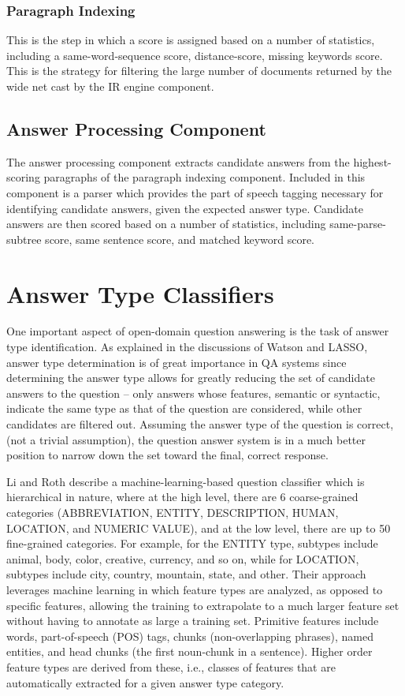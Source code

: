 \subsubsection{Paragraph Indexing}

This is the step in which a score is assigned based on a number of statistics, including a same-word-sequence score, distance-score, missing keywords score.  This is the strategy for filtering the large number of documents returned by the wide net cast by the IR engine component.

\subsection{Answer Processing Component}

The answer processing component extracts candidate answers from the highest-scoring paragraphs of the paragraph indexing component.  Included in this component is a parser which provides the part of speech tagging necessary for identifying candidate answers, given the expected answer type.  Candidate answers are then scored based on a number of statistics, including same-parse-subtree score, same sentence score, and matched keyword score.


\section{Answer Type Classifiers}

One important aspect of open-domain question answering is the task of answer type identification.  As explained in the discussions of Watson and LASSO, answer type determination is of great importance in QA systems since determining the answer type allows for greatly reducing the set of candidate answers to the question – only answers whose features, semantic or syntactic, indicate the same type as that of the question are considered, while other candidates are filtered out.  Assuming the answer type of the question is correct, (not a trivial assumption), the question answer system is in a much better position to narrow down the set toward the final, correct response.

Li and Roth \cite{li2002learning} describe a machine-learning-based question classifier which is hierarchical in nature, where at the high level, there are 6 coarse-grained categories (ABBREVIATION, ENTITY, DESCRIPTION, HUMAN, LOCATION, and NUMERIC VALUE), and at the low level, there are up to 50 fine-grained categories.  For example, for the ENTITY type, subtypes include animal, body, color, creative, currency, and so on, while for LOCATION, subtypes include city, country, mountain, state, and other.  Their approach leverages machine learning in which feature types are analyzed, as opposed to specific features, allowing the training to extrapolate to a much larger feature set without having to annotate as large a training set.  Primitive features include words, part-of-speech (POS) tags, chunks (non-overlapping phrases),  named entities, and head chunks (the first noun-chunk in a sentence).   Higher order feature types are derived from these, i.e., classes of features that are automatically extracted for a given answer type category. 

